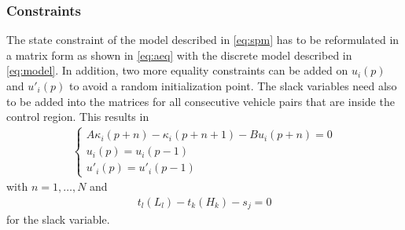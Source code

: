 \documentclass[letterpaper,10pt,conference]{ieeeconf}
\begin{document}
\subsubsection{Constraints}
The state constraint of the model described in \eqref{eq:spm} has to be reformulated in a matrix form as shown in \eqref{eq:aeq} with the discrete model described in \eqref{eq:model}. In addition, two more equality constraints can be added on $u_i(p)$ and $u'_i(p)$ to avoid a random initialization point. The slack variables need also to be added into the matrices for all consecutive vehicle pairs that are inside the control region. This results in
\begin{align}\label{eq1car}
        \begin{cases}
            A\kappa_i(p+n)-\kappa_i(p+n+1) - Bu_i(p+n) = 0\\
            u_i(p) = u_i(p-1)\\
            u'_i(p) = u'_i(p-1)
        \end{cases}
\end{align}
with $n=1,\dots,N$ and
\begin{align}\label{eq1car2}
    t_l(L_l) - t_k(H_k) -s_j = 0
\end{align}
for the slack variable.\\ \indent
\end{document}
